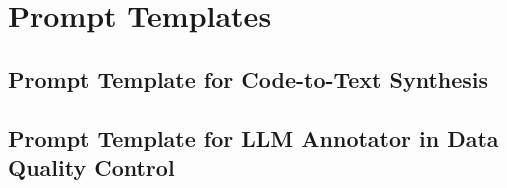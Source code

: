 \section{Prompt Templates}
\label{app:prompt}

\subsection{Prompt Template for Code-to-Text Synthesis}
\vspace{2ex}

\subsection{Prompt Template for LLM Annotator in Data Quality Control}
\vspace{2ex}
